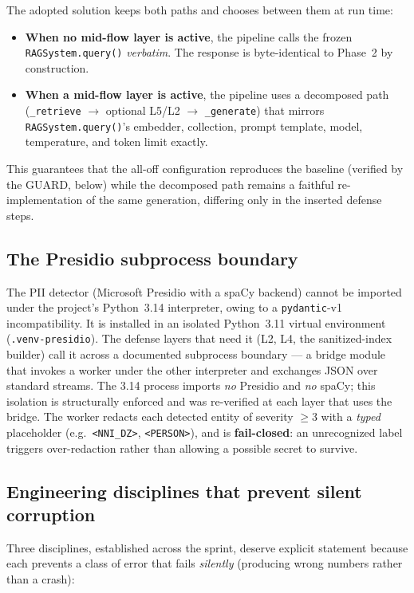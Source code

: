 \documentclass[11pt,a4paper]{article}
\newcommand{\code}[1]{\texttt{\small #1}}
\begin{document}
The adopted solution keeps both paths and chooses between them at run time:
\begin{itemize}[leftmargin=1.4cm]
\item \textbf{When no mid-flow layer is active}, the pipeline calls the frozen \code{RAGSystem.query()} \emph{verbatim}. The response is byte-identical to Phase~2 by construction.
\item \textbf{When a mid-flow layer is active}, the pipeline uses a decomposed path (\code{\_retrieve} $\to$ optional L5/L2 $\to$ \code{\_generate}) that mirrors \code{RAGSystem.query()}'s embedder, collection, prompt template, model, temperature, and token limit exactly.
\end{itemize}
This guarantees that the all-off configuration reproduces the baseline (verified by the GUARD, below) while the decomposed path remains a faithful re-implementation of the same generation, differing only in the inserted defense steps.

\subsection{The Presidio subprocess boundary}
The PII detector (Microsoft Presidio with a spaCy backend) cannot be imported under the project's Python~3.14 interpreter, owing to a \code{pydantic}-v1 incompatibility. It is installed in an isolated Python~3.11 virtual environment (\code{.venv-presidio}). The defense layers that need it (L2, L4, the sanitized-index builder) call it across a documented subprocess boundary --- a bridge module that invokes a worker under the other interpreter and exchanges JSON over standard streams. The 3.14 process imports \emph{no} Presidio and \emph{no} spaCy; this isolation is structurally enforced and was re-verified at each layer that uses the bridge. The worker redacts each detected entity of severity $\geq 3$ with a \emph{typed} placeholder (e.g.\ \code{<NNI\_DZ>}, \code{<PERSON>}), and is \textbf{fail-closed}: an unrecognized label triggers over-redaction rather than allowing a possible secret to survive.

\subsection{Engineering disciplines that prevent silent corruption}
Three disciplines, established across the sprint, deserve explicit statement because each prevents a class of error that fails \emph{silently} (producing wrong numbers rather than a crash):
\end{document}
